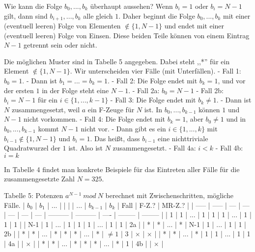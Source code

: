 \documentclass[a4paper]{article}
\begin{document}
\begin{multicols}{3}
        Wie kann die Folge $b_0,...,b_k$ überhaupt aussehen? Wenn $b_i=1$ oder $b_i=N-1$ gilt, dann sind $b_{i+1},...,b_k$ alle gleich $1$. Daher beginnt die Folge $b_0,...,b_k$ mit einer (eventuell leeren) Folge von Elementen $\not\in\{1,N-1\}$ und endet mit einer (eventuell leeren) Folge von Einsen. Diese beiden Teile können von einem Eintrag $N-1$ getrennt sein oder nicht.

        Die möglichen Muster sind in Tabelle 5 angegeben. Dabei steht ,,*'' für ein Element $\not\in\{1,N-1\}$. Wir unterscheiden vier Fälle (mit Unterfällen).
        - Fall 1: $b_0 = 1$. - Dann ist $b_1 =...=b_k= 1$.
        - Fall 2: Die Folge endet mit $b_k= 1$, und vor der ersten $1$ in der Folge steht eine $N-1$.
        - Fall 2a: $b_0 =N-1$
        - Fall 2b: $b_i=N-1$ für ein $i\in\{1,...,k-1\}$
        - Fall 3: Die Folge endet mit $b_k\not= 1$. - Dann ist $N$ zusammengesetzt, weil $a$ ein F-Zeuge für $N$ ist. In $b_0,...,b_{k-1}$ können $1$ und $N-1$ nicht vorkommen.
        - Fall 4: Die Folge endet mit $b_k=1$, aber $b_0\not= 1$ und in $b_0,...,b_{k-1}$ kommt $N-1$ nicht vor. - Dann gibt es ein $i\in\{1,...,k\}$ mit $b_{i-1}\not\in\{1,N-1\}$ und $b_i=1$. Das heißt, dass $b_{i-1}$ eine nichttriviale Quadratwurzel der $1$ ist. Also ist $N$ zusammengesetzt.
        - Fall 4a: $i<k$
        - Fall 4b: $i=k$

        In Tabelle 4 findet man konkrete Beispiele für das Eintreten aller Fälle für die zusammengesetzte Zahl $N=325$.

        Tabelle 5: Potenzen $a^{N-1}\ mod\ N$ berechnet mit Zwischenschritten, mögliche Fälle.
        | $b_0$ | $b_1$ | ... |     |     |     | ... | $b_{k-1}$ | $b_k$     | Fall | F-Z.?    | MR-Z.?   |
        | ----- | ----- | --- | --- | --- | --- | --- | --------- | --------- | ---- | -------- | -------- |
        | 1     | 1     | ... | 1   | 1   | 1   | ... | 1         | 1         | 1    |
        | N-1   | 1     | ... | 1   | 1   | 1   | ... | 1         | 1         | 2a   |
        | *     | *     | ... | *   | N-1 | 1   | ... | 1         | 1         | 2b   |
        | *     | *     | ... | *   | *   | *   | ... | *         | $\not= 1$ | 3    | $\times$ | $\times$ |
        | *     | *     | ... | *   | 1   | 1   | ... | 1         | 1         | 4a   |          | $\times$ |
        | *     | *     | ... | *   | *   | *   | ... | *         | 1         | 4b   |          | $\times$ |


\end{multicols}
\end{document}
